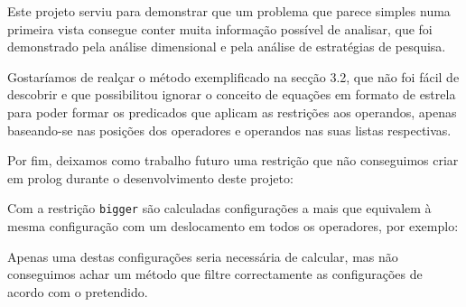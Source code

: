 
Este projeto serviu para demonstrar que um problema que parece simples numa primeira vista consegue conter muita informação possível de analisar, que foi demonstrado pela análise dimensional e pela análise de estratégias de pesquisa.

Gostaríamos de realçar o método exemplificado na secção 3.2, que não foi fácil de descobrir e que possibilitou ignorar o conceito de equações em formato de estrela para poder formar os predicados que aplicam as restrições aos operandos, apenas baseando-se nas posições dos operadores e operandos nas suas listas respectivas.

Por fim, deixamos como trabalho futuro uma restrição que não conseguimos criar em prolog durante o desenvolvimento deste projeto: 

Com a restrição \verb|bigger| são calculadas configurações a mais que equivalem à mesma configuração com um deslocamento em todos os operadores, por exemplo:



Apenas uma destas configurações seria necessária de calcular, mas não conseguimos achar um método que filtre correctamente as configurações de acordo com o pretendido.